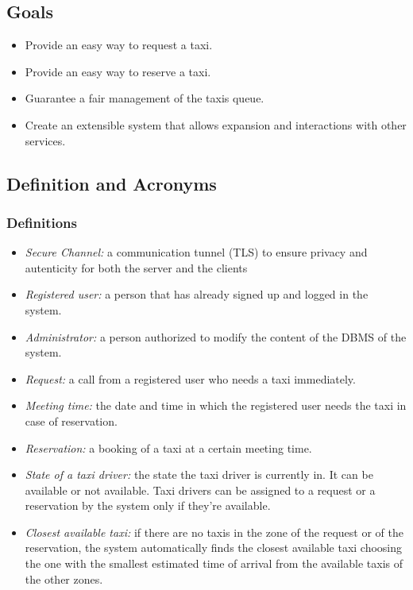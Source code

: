 \documentclass{article}
\begin{document}
\subsection{Goals}
\begin{itemize}
	\item Provide an easy way to request a taxi.
	\item Provide an easy way to reserve a taxi.
	\item Guarantee a fair management of the taxis queue.
	\item Create an extensible system that allows expansion and interactions with other services.
\end{itemize}

\subsection{Definition and Acronyms}

\subsubsection{Definitions}
\begin{itemize}
	\item \textit{Secure Channel:} a communication tunnel (TLS) to ensure privacy and autenticity for both the server and the clients %
	\item \textit{Registered user:} a person that has already signed up and logged in the system.
	\item \textit{Administrator:} a person authorized to modify the content of the DBMS of the system.
	\item \textit{Request:} a call from a registered user who needs a taxi immediately.
	\item \textit{Meeting time:} the date and time in which the registered user needs the taxi in case of reservation.
	\item \textit{Reservation:} a booking of a taxi at a certain meeting time.
	\item \textit{State of a taxi driver:} the state the taxi driver is currently in. It can be available or not available. Taxi drivers can be assigned to a request or a reservation by the system only if they're available.
	\item \textit{Closest available taxi:} if there are no taxis in the zone of the request or of the reservation, the system automatically finds the closest available taxi choosing the one with the smallest estimated time of arrival from the available taxis of the other zones.
\end{itemize}
\end{document}
